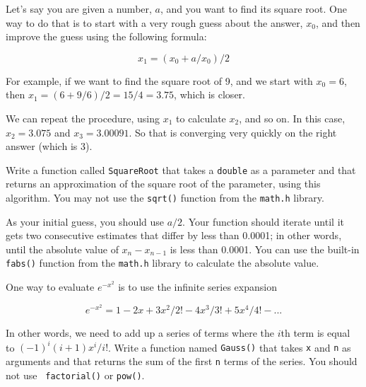 \begin{exercise}
Let's say you are given a number, $a$, and you want to find
its square root.  One way to do that is to start with a very
rough guess about the answer, $x_0$, and then improve
the guess using the following formula:

\begin{displaymath}
x_1 = (x_0 + a/x_0) / 2
\end{displaymath}

For example, if we want to find the square root of 9, and
we start with $x_0 = 6$, then $x_1 = (6 + 9/6) /2 = 15/4 = 3.75$,
which is closer.

We can repeat the procedure, using $x_1$ to calculate $x_2$,
and so on.  In this case, $x_2 = 3.075$ and $x_3 = 3.00091$.
So that is converging very quickly on the right answer (which
is 3).

Write a function called {\tt SquareRoot} that takes a {\tt double}
as a parameter and that returns an approximation of the square
root of the parameter, using this algorithm.  You may not use
the {\tt sqrt()} function from the {\tt math.h} library.

As your initial guess, you should use $a/2$.  Your function should
iterate until it gets two consecutive estimates that differ by
less than 0.0001; in other words, until the absolute value of
$x_n - x_{n-1}$ is less than 0.0001.  You can use the built-in
{\tt fabs()} function from the {\tt math.h} library to calculate the absolute value.
\end{exercise}



\begin{exercise}
One way to evaluate $e^{-x^2}$ is to use the infinite series expansion

\begin{displaymath}
e^{-x^2} = 1 - 2x + 3x^2/2! - 4x^3/3! + 5x^4/4! - ...
\end{displaymath}

In other words, we need to add up a series of terms where the $i$th
term is equal to $(-1)^i(i+1) x^i / i!$.  Write a function named {\tt Gauss()}
that takes {\tt x} and {\tt n} as arguments and that returns the sum
of the first {\tt n} terms of the series.  You should not use {\tt
factorial()} or {\tt pow()}.

\end{exercise}


